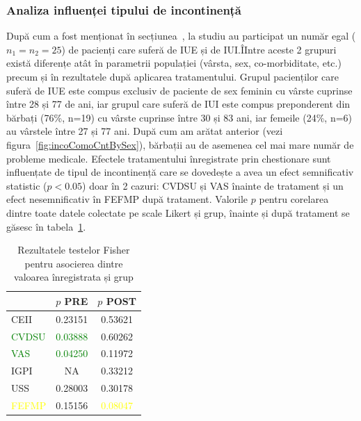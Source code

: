 \documentclass[12pt]{article}
\begin{document}
\subsubsection{Analiza influenței tipului de incontinență}
 După cum a fost menționat în secțiunea~, la studiu au participat un număr egal ($n_1=n_2=25$) de pacienți care suferă de \ac{IUE} și de \ac{IUI}.ÎIntre aceste 2 grupuri există diferențe atât în parametrii populației (vârsta, sex, co-morbiditate, etc.) precum și în rezultatele după aplicarea tratamentului. Grupul pacienților care suferă de \ac{IUE} este compus exclusiv de paciente de sex feminin cu vârste cuprinse între 28 și 77 de ani, iar grupul care suferă de \ac{IUI} este compus preponderent din bărbați (76\%, n=19) cu vârste cuprinse între 30 și 83 ani, iar femeile (24\%, n=6) au vârstele între 27 și 77 ani. După cum am arătat anterior (vezi figura~\ref{fig:incoComoCntBySex}), bărbații au de asemenea cel mai mare număr de probleme medicale.
Efectele tratamentului înregistrate prin chestionare sunt influențate de tipul de incontinență care se dovedește a avea un efect semnificativ statistic ($p<0.05$) doar în 2 cazuri: \ac{CVDSU} și \ac{VAS} înainte de tratament și un efect nesemnificativ în \ac{FEFMP} după tratament. Valorile $p$ pentru corelarea dintre toate datele colectate pe scale Likert și grup, înainte și după tratament se găsesc în tabela~\ref{tab:resFisherGroup}. 
 \begin{table}[H]
	\centering
	\begin{tabular}{|l|c|c|} \hline
	   																	& $p$ PRE 													& $p$ POST \\ \hline
		CEII 														& 0.23151 													& 0.53621 \\ \hline
		\textcolor{green}{CVDSU} 	& \textcolor{green}{0.03888} 	& 0.60262 \\ \hline
		\textcolor{green}{VAS} 			& \textcolor{green}{0.04250} 	& 0.11972 \\ \hline
		IGPI 														& NA 																&  0.33212 \\ \hline
		USS 															& 0.28003 													& 0.30178 \\ \hline
		\textcolor{yellow}{FEFMP} 	& 0.15156 													& \textcolor{yellow}{0.08047} \\ \hline
	\end{tabular}
	\caption{Rezultatele testelor Fisher pentru asocierea dintre valoarea înregistrata și grup} 
	\label{tab:resFisherGroup}
\end{table}
%
\end{document}
